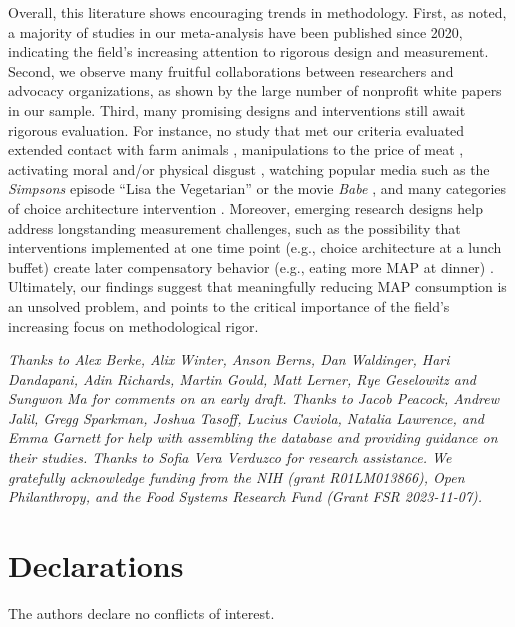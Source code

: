 \documentclass[sn-nature,referee,pdflatex]{sn-jnl}
\begin{document}
Overall, this literature shows encouraging trends in methodology. First,
as noted, a majority of studies in our meta-analysis have been published
since 2020, indicating the field's increasing attention to rigorous
design and measurement. Second, we observe many fruitful collaborations
between researchers and advocacy organizations, as shown by the large
number of nonprofit white papers in our sample. Third, many promising
designs and interventions still await rigorous evaluation. For instance,
no study that met our criteria evaluated extended contact with farm
animals \citep{cerrato2022}, manipulations to the price of meat
\citep{wilde2016}, activating moral and/or physical disgust
\citep{palomo2018}, watching popular media such as the \emph{Simpsons}
episode ``Lisa the Vegetarian'' \citep{byrd2010} or the movie
\emph{Babe} \citep{novatna2019}, and many categories of choice
architecture intervention \citep{olafsson2024}. Moreover, emerging
research designs help address longstanding measurement challenges, such
as the possibility that interventions implemented at one time point
(e.g., choice architecture at a lunch buffet) create later compensatory
behavior (e.g., eating more MAP at dinner) \citep{vocski2024}.
Ultimately, our findings suggest that meaningfully reducing MAP
consumption is an unsolved problem, and points to the critical
importance of the field's increasing focus on methodological rigor.


\emph{Thanks to Alex Berke, Alix Winter, Anson Berns, Dan Waldinger,
Hari Dandapani, Adin Richards, Martin Gould, Matt Lerner, Rye Geselowitz
and Sungwon Ma for comments on an early draft. Thanks to Jacob Peacock,
Andrew Jalil, Gregg Sparkman, Joshua Tasoff, Lucius Caviola, Natalia
Lawrence, and Emma Garnett for help with assembling the database and
providing guidance on their studies. Thanks to Sofia Vera Verduzco for
research assistance. We gratefully acknowledge funding from the NIH
(grant R01LM013866), Open Philanthropy, and the Food Systems Research
Fund (Grant FSR 2023-11-07).}

\section*{Declarations}\label{declarations}

The authors declare no conflicts of interest. \newpage

\renewcommand\refname{References}

\end{document}
